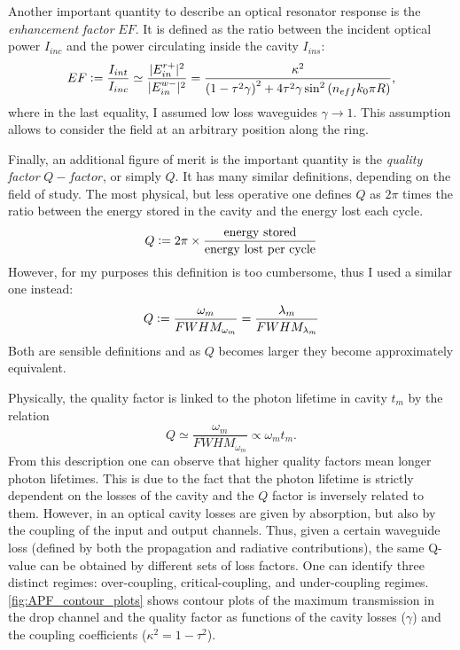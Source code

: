 Another important quantity to describe an optical resonator response is the \textit{enhancement factor} $EF$.
It is defined as the ratio between the incident optical power $I_{inc}$ and the power circulating inside the cavity $I_{ins}$:
\begin{equation}
EF
	\vcentcolon= \dfrac{I_{int}}{I_{inc}}
	\simeq \dfrac{|E_{in}^{r+}|^2}{|E_{in}^{w-}|^2}
	= \dfrac	{ \kappa^2 } { \left( 1-\tau^2	\gamma \right)^2 + 4 \tau^2	\gamma \sin^2 \left( n_{eff} k_0 \pi R \right) },
	\label{eq:enhancement_factor}
\end{equation}
where in the last equality, I assumed low loss waveguides $\gamma \rightarrow 1$.
This assumption allows to consider the field at an arbitrary position along the ring.

Finally, an additional figure of merit is the important quantity is the \textit{quality factor} $Q-factor$, or simply $Q$.
It has many similar definitions, depending on the field of study.
The most physical, but less operative one defines $Q$ as $2\pi$ times the ratio between the energy stored in the cavity and the energy lost each cycle.
\begin{equation}
	Q \vcentcolon= 2\pi \times \frac{\mathrm{energy~stored}}{\mathrm{energy~lost~per~cycle}}
\end{equation}
However, for my purposes this definition is too cumbersome, thus I used a similar one instead:
\begin{equation}
	Q \vcentcolon= \dfrac{\omega_m}{FWHM_{\omega_m}} = \dfrac{\lambda_m}{FWHM_{\lambda_m}}
\end{equation}
Both are sensible definitions and as $Q$ becomes larger they become approximately equivalent.

Physically, the quality factor is linked to the photon lifetime in cavity $t_m$ by the relation
\begin{equation}
	Q \simeq \frac{\omega_m}{FWHM_{\omega_m}} \propto \omega_m t_m.
\end{equation}
From this description one can observe that higher quality factors mean longer photon lifetimes.
This is due to the fact that the photon lifetime is strictly dependent on the losses of the cavity and the $Q$ factor is inversely related to them.
However, in an optical cavity losses are given by absorption, but also by the coupling of the input and output channels.
Thus, given a certain waveguide loss (defined by both the propagation and radiative contributions), the same Q-value can be obtained by different sets of loss factors.
One can identify three distinct regimes: over-coupling, critical-coupling, and under-coupling regimes.
\autoref{fig:APF_contour_plots} shows contour plots of the maximum transmission in the drop channel and the quality factor as functions of the cavity losses ($\gamma$) and the coupling coefficients ($\kappa^2=1-\tau^2$).


